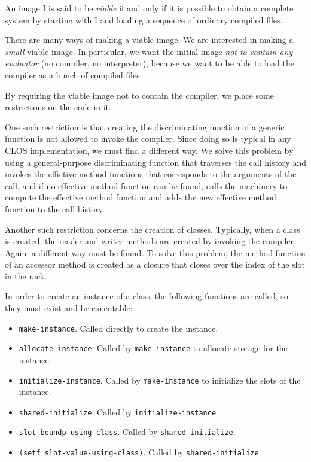 An image I is said to be \emph{viable} if and only if it is possible
to obtain a complete \commonlisp{} system by starting with I and loading a
sequence of ordinary compiled files.

There are many ways of making a viable image.  We are interested in
making a \emph{small} viable image.  In particular, we want the
initial image \emph{not to contain any evaluator} (no compiler, no
interpreter), because we want to be able to load the compiler as a
bunch of compiled files.

By requiring the viable image not to contain the compiler, we place
some restrictions on the code in it.  

One such restriction is that creating the discriminating function of a
generic function is not allowed to invoke the compiler.  Since doing
so is typical in any CLOS implementation, we must find a different
way.  We solve this problem by using a general-purpose discriminating
function that traverses the call history and invokes the effictive
method functions that corresponds to the arguments of the call, and if
no effective method function can be found, calls the machinery to
compute the effective method function and adds the new effective
method function to the call history.

Another such restriction concerns the creation of classes.  Typically,
when a class is created, the reader and writer methods are created by
invoking the compiler.  Again, a different way must be found.  To solve
this problem, the method function of an accessor method is created
as a closure that closes over the index of the slot in the rack.

In order to create an instance of a class, the following functions
are called, so they must exist and be executable:

\begin{itemize}
\item \texttt{make-instance}.  Called directly to create the instance.
\item \texttt{allocate-instance}.  Called by \texttt{make-instance} to
  allocate storage for the instance.
\item \texttt{initialize-instance}.  Called by \texttt{make-instance}
  to initialize the slots of the instance.
\item \texttt{shared-initialize}.  Called by
  \texttt{initialize-instance}.
\item \texttt{slot-boundp-using-class}.  Called by \texttt{shared-initialize}.
\item \texttt{(setf slot-value-using-class)}.  Called by
  \texttt{shared-initialize}.
\end{itemize}


